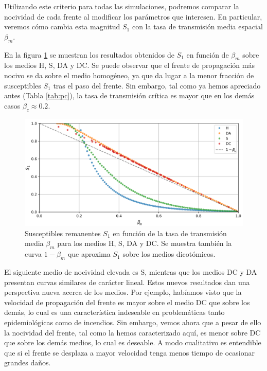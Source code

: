 Utilizando este criterio para todas las simulaciones, podremos comparar 
la nocividad de cada frente al modificar los parámetros que interesen. En particular, veremos cómo cambia esta magnitud $S_1$ con la tasa de transmisión media espacial
$\beta_m$.

En la figura \ref{fig:S_1} se muestran los resultados obtenidos de $S_1$ en función de $\beta_m$ sobre los medios H, S, DA y DC. Se puede 
observar que el frente de propagación más nocivo se da sobre el medio homogéneo, ya que da lugar a la menor fracción de susceptibles $S_1$ tras el paso del frente. Sin 
embargo, tal como ya hemos apreciado antes (Tabla \ref{tab:pc}), la tasa de transmisión crítica es mayor que en los demás casos $\beta_c\approx0.2$.

\begin{figure}[!t]
    \centering
    \includegraphics[width=\imsizeL]{S1_all.png}
    \caption[Susceptibles remanentes $S_1$ en función de $\beta_m$ para los medios H, S, DA y DC]{Susceptibles remanentes $S_1$ en función de la tasa de transmisión media $\beta_m$ para los medios H, S, DA y DC. Se muestra también la curva $1-\beta_m$ que aproxima $S_1$ sobre los medios dicotómicos.}
    \label{fig:S_1}
\end{figure}

El siguiente medio de nocividad elevada es S, mientras que los medios DC y DA presentan curvas similares de carácter lineal. Estos nuevos resultados dan una perspectiva 
nueva acerca de los medios. Por ejemplo, habíamos visto que la velocidad de propagación del frente es mayor sobre el medio DC que sobre los demás, lo cual es una 
característica indeseable en problemáticas tanto epidemiológicas como de incendios. Sin embargo, vemos ahora que a pesar de ello la nocividad del frente, tal como la
hemos caracterizado aquí, es menor sobre DC que sobre los demás medios, lo cual es deseable. A modo cualitativo es entendible que si el frente se desplaza a mayor 
velocidad tenga menos tiempo de ocasionar grandes daños. 

